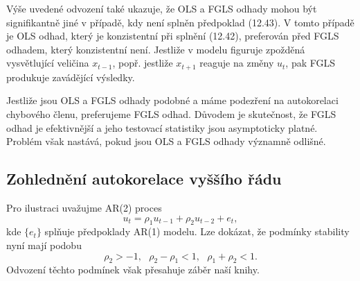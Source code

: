 Výše uvedené odvození také ukazuje, že OLS a FGLS odhady mohou být signifikantně jiné v případě, kdy není splněn předpoklad (12.43). V tomto případě je OLS odhad, který je konzistentní při splnění (12.42), preferován před FGLS odhadem, který konzistentní není. Jestliže v modelu figuruje zpožděná vysvětlující veličina $x_{t - 1}$, popř. jestliže $x_{t + 1}$ reaguje na změny $u_t$, pak FGLS produkuje zavádějící výsledky.

Jestliže jsou OLS a FGLS odhady podobné a máme podezření na autokorelaci chybového členu, preferujeme FGLS odhad. Důvodem je skutečnost, že FGLS odhad je efektivnější a jeho testovací statistiky jsou asymptoticky platné. Problém však nastává, pokud jsou OLS a FGLS odhady významně odlišné.

\subsection{Zohlednění autokorelace vyššího řádu}

Pro ilustraci uvažujme AR(2) proces
\begin{equation}
u_t = \rho_1 u_{t - 1} + \rho_2 u_{t - 2} + e_t,
\end{equation}
kde $\{e_t\}$ splňuje předpoklady AR(1) modelu. Lze dokázat, že podmínky stability nyní mají podobu
\begin{equation}
\rho_2 > -1, ~~~ \rho_2 - \rho_1 < 1, ~~~ \rho_1 + \rho_2 < 1.
\end{equation}
Odvození těchto podmínek však přesahuje záběr naší knihy.

